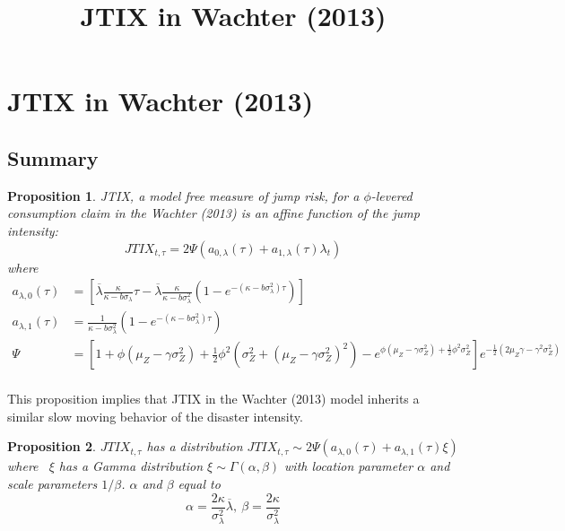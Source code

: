 \documentclass[11pt]{article}
\title{JTIX in Wachter (2013)}
\newtheorem{proposition}{Proposition}
\begin{document}

\section{JTIX in Wachter (2013)}

\subsection{Summary}

\begin{proposition}
    JTIX, a model free measure of jump risk, for a $\phi$-levered consumption claim in the Wachter (2013) is an affine function of the jump intensity:
    \[JTIX_{t,\tau} = 2\Psi(a_{0,\lambda}(\tau) + a_{1,\lambda}(\tau)\lambda_t)\]
    where
    \[
        \begin{aligned}
            a_{\lambda, 0}(\tau) &= \left[\overline{\lambda}\frac{\kappa}{\kappa - b\sigma_\lambda}\tau - \overline{\lambda}\frac{\kappa}{\kappa - b\sigma_\lambda^2}\left(1-e^{-(\kappa - b\sigma_\lambda^2)\tau}\right)\right] \\
            a_{\lambda,1}(\tau) &= \frac{1}{\kappa - b \sigma_\lambda^2}\left(1-e^{-(\kappa-b\sigma_\lambda^2)\tau}\right) \\
            \Psi &= \left[1 + \phi(\mu_Z - \gamma\sigma_Z^2) + \frac{1}{2}\phi^2(\sigma_Z^2 + (\mu_Z - \gamma\sigma_Z^2)^2) - e^{\phi(\mu_Z - \gamma\sigma_Z^2) + \frac{1}{2}\phi^2\sigma_Z^2}\right]e^{-\frac{1}{2}(2\mu_Z \gamma - \gamma^2\sigma_Z^2)} \\
        \end{aligned}
    \]
\end{proposition}

This proposition implies that JTIX in the Wachter (2013) model inherits a similar slow moving behavior of the disaster intensity.

\begin{proposition}
    $JTIX_{t,\tau}$ has a distribution $JTIX_{t,\tau} \sim 2\Psi (a_{\lambda, 0}(\tau) + a_{\lambda, 1}(\tau)\xi)$ where  $\xi$ has a Gamma distribution $\xi \sim \Gamma(\alpha, \beta)$ with location parameter $\alpha$ and scale parameters $1/\beta$. $\alpha$ and $\beta$ equal to
    \[\alpha = \frac{2\kappa}{\sigma_\lambda^2}\overline{\lambda}, \ \beta = \frac{2\kappa}{\sigma_\lambda^2}\]
\end{proposition}
\end{document}
